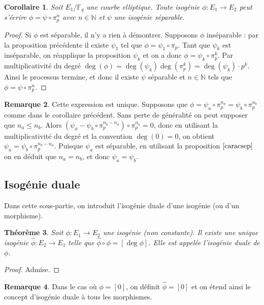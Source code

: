 \documentclass{article}
\theoremstyle{plain}%
\newtheorem{thm}{Théorème}[section]
\newtheorem{cor}[thm]{Corollaire}
\theoremstyle{definition}%
\newtheorem{rem}[thm]{Remarque}
\newcommand{\F}{\mathbb{F}}
\newcommand{\N}{\mathbb{N}}
\newcommand{\h}{\widehat}
\begin{document}
\begin{cor}
  Soit $E_1/\F_q$ une courbe elliptique. Toute isogénie $\phi : E_1 \to E_2 $ peut s'écrire $\phi = \psi \circ \pi_p^n$ avec $n\in \N$ et $\psi$ une isogénie séparable.
\end{cor}

\begin{proof}
  Si $\phi$ est séparable, il n'y a rien à démontrer. Supposons $\phi$ inséparable : par la proposition précédente il existe $\psi_1$ tel que $\phi = \psi_1 \circ \pi_p$. Tant que $\psi_k$ est inséparable, on réapplique la proposition $\psi_k$ et on a donc $\phi = \psi_k \circ \pi_p^k$. 
  Par multiplicativité du degré $\deg(\phi) = \deg(\psi_k)\deg(\pi_p^k) = \deg(\psi_k)\cdot p^k$.
  Ainsi le processus termine, et donc il existe $\psi$ séparable et $n\in \N$ tels que $\phi = \psi \circ \pi_p^n$.
\end{proof}

\begin{rem}
  Cette expression est unique. Supposons que $\phi = \psi_a \circ \pi_p^{n_a} = \psi_b \circ \pi_p^{n_b}$ comme dans le corollaire précédent. Sans perte de généralité on peut supposer que $n_a \le n_b$. Alors $(\psi_a - \psi_b \circ \pi_p^{n_b - n_a}) \circ \pi_p^{n_a} = 0$, donc en utilisant la multiplicativité du degré et la convention $\deg(0) = 0$, on obtient $\psi_a = \psi_b \circ \pi_p^{n_b - n_a}$. Puisque $\psi_a$ est séparable, en utilisant la proposition $\ref{caracsep}$ on en déduit que $n_a = n_b$, et donc $\psi_a = \psi_b$.
\end{rem}

\subsection{Isogénie duale}

Dans cette sous-partie, on introduit l'isogénie duale d'une isogénie (ou d'un morphisme).

\begin{thm}
  \label{existence_duale}
  Soit $\phi : E_1\to E_2$ une isogénie (non constante). Il existe une unique isogénie $\h\phi : E_2\to E_1$ telle que $\h\phi \circ \phi = [\deg\phi]$. Elle est appelée l'isogénie duale de $\phi$.
\end{thm}

\begin{proof}
  Admise. 
\end{proof}

\begin{rem}
Dans le cas où $\phi = [0]$, on définit $\h\phi = [0]$ et on étend ainsi le concept d'isogénie duale à tous les morphismes.
\end{rem}
\end{document}
